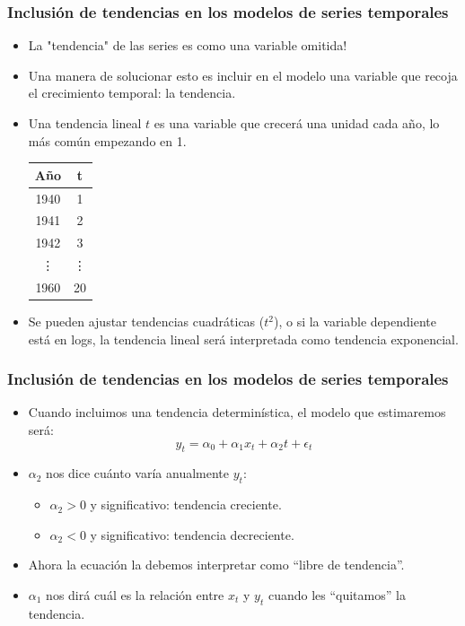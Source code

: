 \documentclass{beamer}
\begin{document}
\begin{frame}
\frametitle{Inclusión de tendencias en los modelos de series temporales}

\begin{itemize}
  \item La "tendencia" de las series es como una variable omitida!
  \item Una manera de solucionar esto es incluir en el modelo una variable que recoja el crecimiento temporal: la tendencia.
  \item Una tendencia lineal \( t \) es una variable que crecerá una unidad cada año, lo más común empezando en 1.
\begin{center}
\begin{tabular}{c c}
\hline
Año & t \\
\hline
1940 & 1 \\
1941 & 2 \\
1942 & 3 \\
\vdots & \vdots \\
1960 & 20 \\
\hline
\end{tabular}
\end{center}
  \item Se pueden ajustar tendencias cuadráticas (\( t^2 \)), o si la variable dependiente está en logs, la tendencia lineal será interpretada como tendencia exponencial.
\end{itemize}

\end{frame}
\begin{frame}
\frametitle{Inclusión de tendencias en los modelos de series temporales}

\begin{itemize}
  \item Cuando incluimos una tendencia determinística, el modelo que estimaremos será:
  \[
  y_t = \alpha_0 + \alpha_1 x_t + \alpha_2 t + \epsilon_t
  \]
  \item \(\alpha_2\) nos dice cuánto varía anualmente \( y_t \):
  \begin{itemize}
    \item \(\alpha_2 > 0\) y significativo: tendencia creciente.
    \item \(\alpha_2 < 0\) y significativo: tendencia decreciente.
  \end{itemize}
  \item Ahora la ecuación la debemos interpretar como “libre de tendencia”.
  \item \(\alpha_1\) nos dirá cuál es la relación entre \( x_t \) y \( y_t \) cuando les “quitamos” la tendencia.
\end{itemize}

\end{frame}
\end{document}

